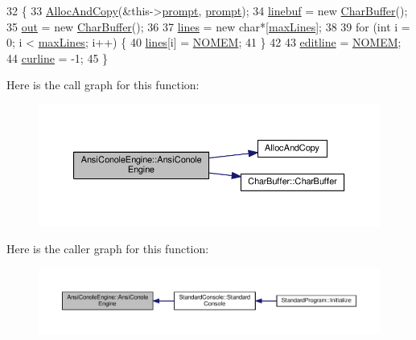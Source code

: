 \begin{DoxyCode}
32 \{
33     \hyperlink{clib_8h_a5bed05c70cb17e541fee570b5dc32e1a}{AllocAndCopy}(&this->\hyperlink{classAnsiConoleEngine_a97ebef63ba0490711ed78733b6a87be5}{prompt}, \hyperlink{classAnsiConoleEngine_a97ebef63ba0490711ed78733b6a87be5}{prompt});
34     \hyperlink{classAnsiConoleEngine_a6bf88afa72a458e3687972f9e666cd86}{linebuf} = \textcolor{keyword}{new} \hyperlink{classCharBuffer}{CharBuffer}();
35     \hyperlink{classAnsiConoleEngine_ad6a604fc0a0f544907513076c72434f3}{out} = \textcolor{keyword}{new} \hyperlink{classCharBuffer}{CharBuffer}();
36 
37     \hyperlink{classAnsiConoleEngine_a624ec5321c326a68de340f9b77e84c2c}{lines} = \textcolor{keyword}{new} \textcolor{keywordtype}{char}*[\hyperlink{classAnsiConoleEngine_a3f94786b1610ac3f038d5115fd8047a3}{maxLines}];
38 
39     \textcolor{keywordflow}{for} (\textcolor{keywordtype}{int} i = 0; i < \hyperlink{classAnsiConoleEngine_a3f94786b1610ac3f038d5115fd8047a3}{maxLines}; i++) \{
40         \hyperlink{classAnsiConoleEngine_a624ec5321c326a68de340f9b77e84c2c}{lines}[i] = \hyperlink{platform_8h_a46ff2bfbf0d44b8466a2251d5bd5e6f8}{NOMEM};
41     \}
42 
43     \hyperlink{classAnsiConoleEngine_a465421c5488f2566d12717641a327017}{editline} = \hyperlink{platform_8h_a46ff2bfbf0d44b8466a2251d5bd5e6f8}{NOMEM};
44     \hyperlink{classAnsiConoleEngine_ab029fc4a19c5fbd6f6b23c390af618b8}{curline} = -1;
45 \}
\end{DoxyCode}


Here is the call graph for this function\+:\nopagebreak
\begin{figure}[H]
\begin{center}
\leavevmode
\includegraphics[width=350pt]{classAnsiConoleEngine_aac394a191db46deb09a08522bdf72218_cgraph}
\end{center}
\end{figure}




Here is the caller graph for this function\+:\nopagebreak
\begin{figure}[H]
\begin{center}
\leavevmode
\includegraphics[width=350pt]{classAnsiConoleEngine_aac394a191db46deb09a08522bdf72218_icgraph}
\end{center}
\end{figure}


